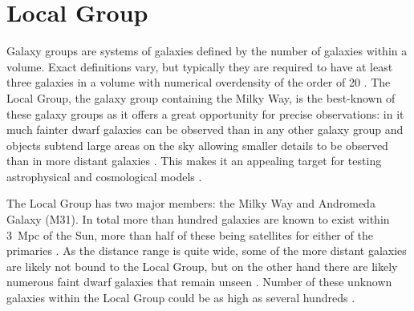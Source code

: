 \documentclass[english, oneside]{HYgradu}
\begin{document}



\section{Local Group}
Galaxy groups are systems of galaxies defined by the number of galaxies within a volume. Exact definitions vary, but typically they are required to have at least three galaxies in a volume with numerical overdensity of the order of 20 \citep{mo2010galaxy}. The Local Group, the galaxy group containing the Milky Way, is the best-known of these galaxy groups as it offers a great opportunity for precise observations: in it much fainter dwarf galaxies can be observed than in any other galaxy group and objects subtend large areas on the sky allowing smaller details to be observed than in more distant galaxies \citep{mo2010galaxy, mcconnachie2012observed}. This makes it an appealing target for testing astrophysical and cosmological models \citep{bullock2017small}.

The Local Group has two major members: the Milky Way and Andromeda Galaxy (M31). In total more than hundred galaxies are known to exist within 3~Mpc of the Sun, more than half of these being satellites for either of the primaries \citep{mcconnachie2012observed}. As the distance range is quite wide, some of the more distant galaxies are likely not bound to the Local Group, but on the other hand there are likely numerous faint dwarf galaxies that remain unseen \citep{mcconnachie2012observed}. Number of these unknown galaxies within the Local Group could be as high as several hundreds \citep{tollerud2008hundreds}.
\end{document}
